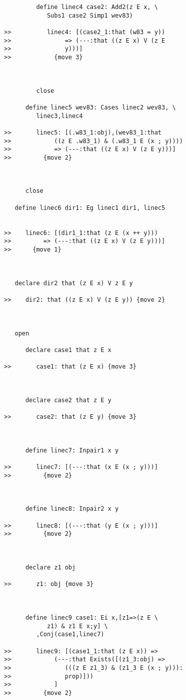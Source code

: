 \documentclass[12pt]{article}
\begin{document}
\begin{verbatim}
         define linec4 case2: Add2(z E x, \
            Subs1 case2 Simp1 wev83)

>>          linec4: [(case2_1:that (w83 = y))
>>               => (---:that ((z E x) V (z E
>>               y)))]
>>            {move 3}



         close

      define linec5 wev83: Cases linec2 wev83, \
         linec3,linec4

>>       linec5: [(.w83_1:obj),(wev83_1:that
>>            ((z E .w83_1) & (.w83_1 E (x ; y))))
>>            => (---:that ((z E x) V (z E y)))]
>>         {move 2}



      close

   define linec6 dir1: Eg linec1 dir1, linec5


>>    linec6: [(dir1_1:that (z E (x ++ y)))
>>         => (---:that ((z E x) V (z E y)))]
>>      {move 1}



   declare dir2 that (z E x) V z E y

>>    dir2: that ((z E x) V (z E y)) {move 2}



   open

      declare case1 that z E x

>>       case1: that (z E x) {move 3}



      declare case2 that z E y

>>       case2: that (z E y) {move 3}



      define linec7: Inpair1 x y

>>       linec7: [(---:that (x E (x ; y)))]
>>         {move 2}



      define linec8: Inpair2 x y

>>       linec8: [(---:that (y E (x ; y)))]
>>         {move 2}



      declare z1 obj

>>       z1: obj {move 3}



      define linec9 case1: Ei x,[z1=>(z E \
            z1) & z1 E x;y] \
         ,Conj(case1,linec7)

>>       linec9: [(case1_1:that (z E x)) =>
>>            (---:that Exists([(z1_3:obj) =>
>>               (((z E z1_3) & (z1_3 E (x ; y))):
>>               prop)]))
>>            ]
>>         {move 2}




\end{verbatim}
\end{document}
